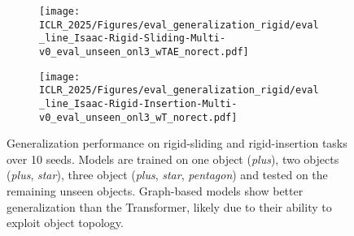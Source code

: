 \begin{wrapfigure}[18]{r}{0.475\textwidth}
  \vspace{-0.3in}
   \begin{center}
    \makebox[0.5\textwidth][c]{
    
    }

    \begin{subfigure}[b]{0.49\linewidth}
        \texttt{[image: ICLR\_2025/Figures/eval\_generalization\_rigid/eval\_line\_Isaac-Rigid-Sliding-Multi-v0\_eval\_unseen\_onl3\_wTAE\_norect.pdf]}
    \end{subfigure}
    \hfill
    \begin{subfigure}[b]{0.49\linewidth}
        \texttt{[image: ICLR\_2025/Figures/eval\_generalization\_rigid/eval\_line\_Isaac-Rigid-Insertion-Multi-v0\_eval\_unseen\_onl3\_wT\_norect.pdf]}
    \end{subfigure}
  \end{center}
  \vspace{-0.15in}
    \caption{Generalization performance on rigid-sliding and rigid-insertion tasks over 10 seeds. Models are trained on one object (\textit{plus}), two objects (\textit{plus}, \textit{star}), three object (\textit{plus}, \textit{star}, \textit{pentagon}) and tested on the remaining unseen objects. Graph-based models show better generalization than the Transformer, likely due to their ability to exploit object topology.}
    \label{fig:eval_generalization}
\end{wrapfigure}

